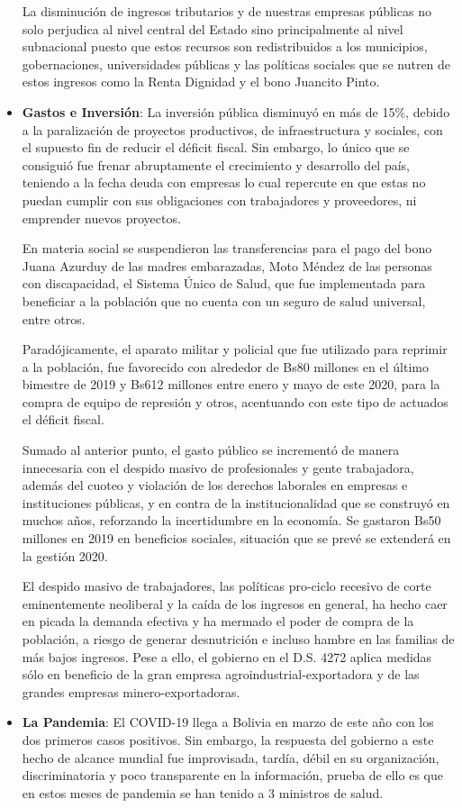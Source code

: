\documentclass[a4paper, nobind]{templates/ociamthesis}
\begin{document}
\begin{itemize}
  La disminución de ingresos tributarios y de nuestras empresas públicas no solo perjudica al nivel central del Estado sino principalmente al nivel subnacional puesto que estos recursos son redistribuidos a los municipios, gobernaciones, universidades públicas y las políticas sociales que se nutren de estos ingresos como la Renta Dignidad y el bono Juancito Pinto.
\item
  \textbf{Gastos e Inversión}: La inversión pública disminuyó en más de 15\%, debido a la paralización de proyectos productivos, de infraestructura y sociales, con el supuesto fin de reducir el déficit fiscal. Sin embargo, lo único que se consiguió fue frenar abruptamente el crecimiento y desarrollo del país, teniendo a la fecha deuda con empresas lo cual repercute en que estas no puedan cumplir con sus obligaciones con trabajadores y proveedores, ni emprender nuevos proyectos.

  En materia social se suspendieron las transferencias para el pago del bono Juana Azurduy de las madres embarazadas, Moto Méndez de las personas con discapacidad, el Sistema Único de Salud, que fue implementada para beneficiar a la población que no cuenta con un seguro de salud universal, entre otros.

  Paradójicamente, el aparato militar y policial que fue utilizado para reprimir a la población, fue favorecido con alrededor de Bs80 millones en el último bimestre de 2019 y Bs612 millones entre enero y mayo de este 2020, para la compra de equipo de represión y otros, acentuando con este tipo de actuados el déficit fiscal.

  Sumado al anterior punto, el gasto público se incrementó de manera innecesaria con el despido masivo de profesionales y gente trabajadora, además del cuoteo y violación de los derechos laborales en empresas e instituciones públicas, y en contra de la institucionalidad que se construyó en muchos años, reforzando la incertidumbre en la economía. Se gastaron Bs50 millones en 2019 en beneficios sociales, situación que se prevé se extenderá en la gestión 2020.

  El despido masivo de trabajadores, las políticas pro-ciclo recesivo de corte eminentemente neoliberal y la caída de los ingresos en general, ha hecho caer en picada la demanda efectiva y ha mermado el poder de compra de la población, a riesgo de generar desnutrición e incluso hambre en las familias de más bajos ingresos. Pese a ello, el gobierno en el D.S. 4272 aplica medidas sólo en beneficio de la gran empresa agroindustrial-exportadora y de las grandes empresas minero-exportadoras.
\item
  \textbf{La Pandemia}: El COVID-19 llega a Bolivia en marzo de este año con los dos primeros casos positivos. Sin embargo, la respuesta del gobierno a este hecho de alcance mundial fue improvisada, tardía, débil en su organización, discriminatoria y poco transparente en la información, prueba de ello es que en estos meses de pandemia se han tenido a 3 ministros de salud.


\end{itemize}
\end{document}
